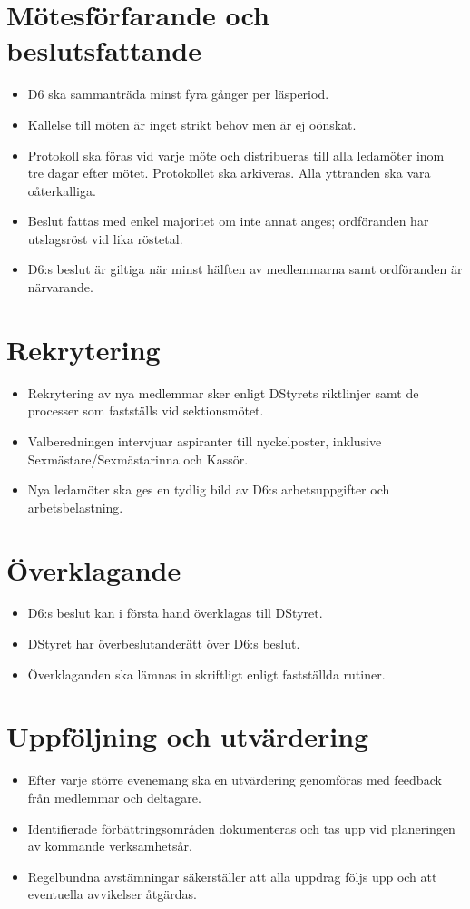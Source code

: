 \documentclass[a4paper]{dtekinstruktion}
\begin{document}
\section{Mötesförfarande och beslutsfattande}
\begin{itemize}
  \item D6 ska sammanträda minst fyra gånger per läsperiod.
  \item Kallelse till möten är inget strikt behov men är ej oönskat.
  \item Protokoll ska föras vid varje möte och distribueras till alla ledamöter inom tre dagar efter mötet. Protokollet ska arkiveras. Alla yttranden ska vara oåterkalliga.
  \item Beslut fattas med enkel majoritet om inte annat anges; ordföranden har utslagsröst vid lika röstetal.
  \item D6:s beslut är giltiga när minst hälften av medlemmarna samt ordföranden är närvarande.
\end{itemize}

\section{Rekrytering}
\begin{itemize}
  \item Rekrytering av nya medlemmar sker enligt DStyrets riktlinjer samt de processer som fastställs vid sektionsmötet.
  \item Valberedningen intervjuar aspiranter till nyckelposter, inklusive Sexmästare/Sexmästarinna och Kassör.
  \item Nya ledamöter ska ges en tydlig bild av D6:s arbetsuppgifter och arbetsbelastning.
\end{itemize}

\section{Överklagande}
\begin{itemize}
  \item D6:s beslut kan i första hand överklagas till DStyret.
  \item DStyret har överbeslutanderätt över D6:s beslut.
  \item Överklaganden ska lämnas in skriftligt enligt fastställda rutiner.
\end{itemize}

\section{Uppföljning och utvärdering}
\begin{itemize}
  \item Efter varje större evenemang ska en utvärdering genomföras med feedback från medlemmar och deltagare.
  \item Identifierade förbättringsområden dokumenteras och tas upp vid planeringen av kommande verksamhetsår.
  \item Regelbundna avstämningar säkerställer att alla uppdrag följs upp och att eventuella avvikelser åtgärdas.
\end{itemize}
\end{document}
